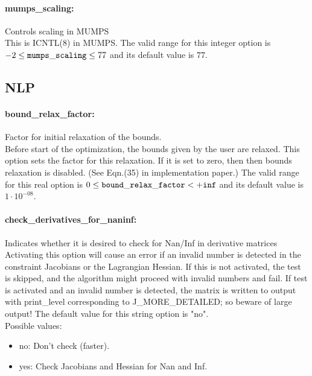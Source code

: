 \paragraph{mumps\_scaling:}\label{sec:mumps_scaling} Controls scaling in MUMPS $\;$ \\
 This is ICNTL(8) in MUMPS. The valid range for this integer option is
$-2 \le {\tt mumps\_scaling } \le 77$
and its default value is $77$.


\subsection{NLP}
\label{sec:NLP}
\paragraph{bound\_relax\_factor:}\label{sec:bound_relax_factor} Factor for initial relaxation of the bounds. $\;$ \\
 Before start of the optimization, the bounds
given by the user are relaxed.  This option sets
the factor for this relaxation.  If it is set to
zero, then then bounds relaxation is disabled.
(See Eqn.(35) in implementation paper.) The valid range for this real option is 
$0 \le {\tt bound\_relax\_factor } <  {\tt +inf}$
and its default value is $1 \cdot 10^{-08}$.


\paragraph{check\_derivatives\_for\_naninf:}\label{sec:check_derivatives_for_naninf} Indicates whether it is desired to check for Nan/Inf in derivative matrices $\;$ \\
 Activating this option will cause an error if an
invalid number is detected in the constraint
Jacobians or the Lagrangian Hessian.  If this is
not activated, the test is skipped, and the
algorithm might proceed with invalid numbers and
fail.  If test is activated and an invalid number
is detected, the matrix is written to output with
print\_level corresponding to J\_MORE\_DETAILED;
so beware of large output!
The default value for this string option is "no".
\\ 
Possible values:
\begin{itemize}
   \item no: Don't check (faster).
   \item yes: Check Jacobians and Hessian for Nan and Inf.
\end{itemize}

